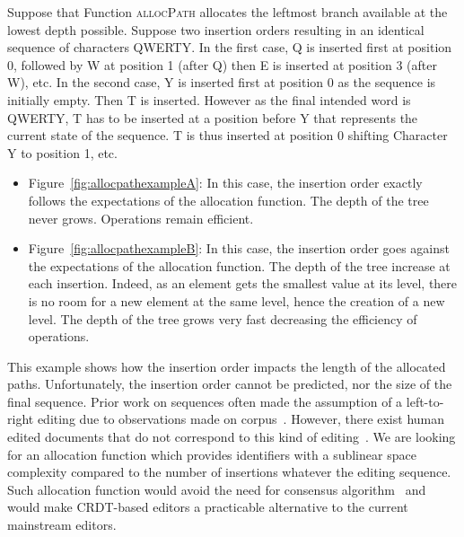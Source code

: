 Suppose that Function \textsc{allocPath} allocates the leftmost branch available
at the lowest depth possible. Suppose two insertion orders resulting in an
identical sequence of characters QWERTY.  In the first case, Q is inserted first
at position 0, followed by W at position 1 (after Q) then E is inserted at
position 3 (after W), etc.  In the second case, Y is inserted first at position
0 as the sequence is initially empty. Then T is inserted. However as the final
intended word is QWERTY, T has to be inserted at a position before Y that
represents the current state of the sequence. T is thus inserted at position 0
shifting Character Y to position 1, etc.


\begin{itemize}[noitemsep, leftmargin=*]
\item Figure~\ref{fig:allocpathexampleA}: In this case, the insertion order
  exactly follows the expectations of the allocation function. The depth of the
  tree never grows. Operations remain efficient.

\item Figure~\ref{fig:allocpathexampleB}: In this case, the insertion order goes
  against the expectations of the allocation function. The depth of the tree
  increase at each insertion. Indeed, as an element gets the smallest value at
  its level, there is no room for a new element at the same level, hence the
  creation of a new level. The depth of the tree grows very fast decreasing the
  efficiency of operations.
\end{itemize}

This example shows how the insertion order impacts the length of the allocated
paths. Unfortunately, the insertion order cannot be predicted, nor the size of
the final sequence. Prior work on sequences often made the assumption of a
left-to-right editing due to observations made on
corpus~\cite{preguica2009commutative, weiss2009logoot}. However, there exist
human edited documents that do not correspond to this kind of
editing~\cite{nedelec2013lseq}.
We are looking for an allocation function which provides identifiers with a
sublinear space complexity compared to the number of insertions whatever the
editing sequence. Such allocation function would avoid the need for consensus
algorithm~\cite{mostefaoui2015signature} and would make CRDT-based editors a
practicable alternative to the current mainstream editors.
 
